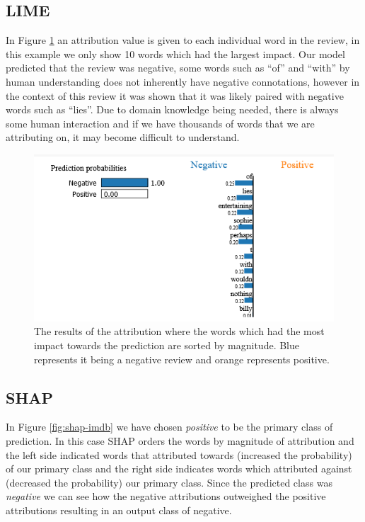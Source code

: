 \subsection{LIME}
In Figure \ref{fig:lime-imdb} an attribution value is given to each individual word in the review, in this example we only show 10 words which had the largest impact. Our model predicted that the review was negative, some words such as ``of'' and ``with'' by human understanding does not inherently have negative connotations, however in the context of this review it was shown that it was likely paired with negative words such as ``lies''. Due to domain knowledge being needed, there is always some human interaction and if we have thousands of words that we are attributing on, it may become difficult to understand.
\begin  {figure}[!htpb]
  \includegraphics[width=\linewidth]{Evaluation_Images/IMDB_explanation_1.png}
  \caption{The results of the attribution where the words which had the most impact towards the prediction are sorted by magnitude. Blue represents it being a negative review and orange represents positive.}
  \label{fig:lime-imdb}
\end{figure}


\subsection{SHAP}
In Figure \ref{fig:shap-imdb} we have chosen \emph{positive} to be the primary class of prediction. In this case SHAP orders the words by magnitude of attribution and the left side indicated words that attributed towards (increased the probability) of our primary class and the right side indicates words which attributed against (decreased the probability) our primary class. Since the predicted class was \emph{negative} we can see how the negative attributions outweighed the positive attributions resulting in an output class of negative.

